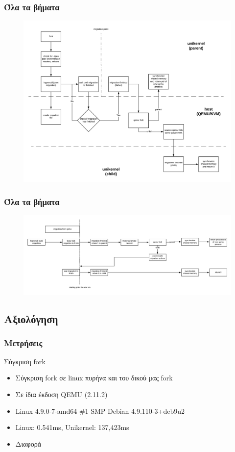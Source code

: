\documentclass[red,slidestop,notes,compress,mathserif]{beamer}
\begin{document}
\begin{frame}
\frametitle{Όλα τα βήματα}
\begin{figure}
\center
\includegraphics[scale=0.38]{figures/fork_olo.png}
\end{figure}
\end{frame}

\begin{frame}
\frametitle{Όλα τα βήματα}
\begin{figure}
\center
\includegraphics[scale=0.4]{figures/fork_timeline.png}
\end{figure}
\end{frame}

\subsection{Αξιολόγηση}
\begin{frame}
\frametitle{Μετρήσεις}
\begin{block}{Σύγκριση fork}
\begin{itemize}
\item Σύγκριση fork σε linux πυρήνα και του δικού μας fork 
\item Σε ίδια έκδοση QEMU (2.11.2)
\item Linux 4.9.0-7-amd64 \#1 SMP Debian 4.9.110-3+deb9u2
\item Linux: 0.541ms, Unikernel: 137,423ms
\item Διαφορά
\end{itemize}
\end{block}
\end{frame}
\end{document}
